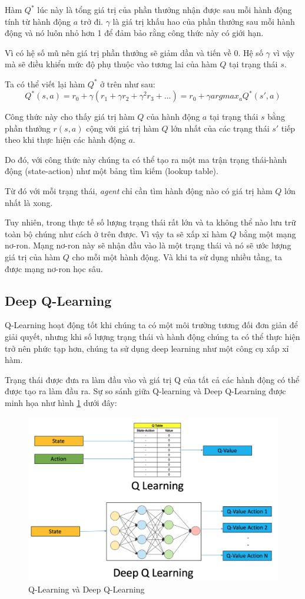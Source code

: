 Hàm $Q^*$ lúc này là tổng giá trị của phần thưởng nhận được sau
mỗi hành động tính từ hành động $a$ trở đi. $\gamma$ là giá trị
khấu hao của phần thưởng sau mỗi hành động và nó luôn nhỏ hơn 1
để đảm bảo rằng công thức này có giới hạn.

Vì có hệ số mũ nên giá trị phần thưởng sẽ giảm dần và tiến về 0.
Hệ số $\gamma$ vì vậy mà sẽ điều khiển mức độ phụ thuộc vào
tương lai của hàm $Q$ tại trạng thái $s$.

Ta có thể viết lại hàm $Q^*$ ở trên như sau:
\begin{equation*}
    Q^*(s,a) = r_0 + {\gamma}(r_1 + {\gamma}r_2 + {\gamma}^{2}r_3 + ...) = r_0 + {\gamma}argmax_{a}Q^{*}(s',a)
\end{equation*}

Công thức này cho thấy giá trị hàm $Q$ của hành động $a$ tại
trạng thái $s$ bằng phần thưởng $r(s,a)$ cộng với giá trị hàm $Q$
lớn nhất của các trạng thái $s'$ tiếp theo khi thực hiện
các hành động $a$.

Do đó, với công thức này chúng ta có thể tạo ra một ma trận
trạng thái-hành động (state-action) như một bảng tìm kiếm
(lookup table).

Từ đó với mỗi trạng thái, \textit{agent} chỉ cần tìm hành động
nào có giá trị hàm $Q$ lớn nhất là xong.

Tuy nhiên, trong thực tế số lượng trạng thái rất lớn và ta
không thể nào lưu trữ toàn bộ chúng như cách ở trên được.
Vì vậy ta sẽ xấp xỉ hàm $Q$ bằng một mạng nơ-ron.
Mạng nơ-ron này sẽ nhận đầu vào là một trạng thái và
nó sẽ ước lượng giá trị của hàm $Q$ cho mỗi một hành động.
Và khi ta sử dụng nhiều tầng, ta được mạng nơ-ron học sâu.

\subsection{Deep Q-Learning}
Q-Learning hoạt động tốt khi chúng ta có một môi trường tương đối
đơn giản để giải quyết, nhưng khi số lượng trạng thái và hành động
chúng ta có thể thực hiện trở nên phức tạp hơn, chúng ta sử dụng
deep learning như một công cụ xấp xỉ hàm.

Trạng thái được đưa ra làm đầu vào và giá trị Q của tất cả các
hành động có thể được tạo ra làm đầu ra. Sự so sánh giữa Q-learning
và Deep Q-Learning được minh họa như hình \ref{fig:dqlearning}
\cite{introductiondeepqlearningpython} dưới đây:

\begin{figure}[ht]
    \centering
    \includegraphics[width=1\textwidth]{thesis/chatbot-outline/kienthucnentang/dqlearning.png}
    \caption{Q-Learning và Deep Q-Learning}
    \label{fig:dqlearning}
\end{figure}
